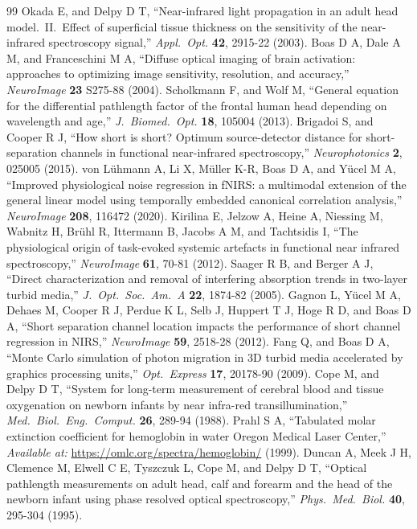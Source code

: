\documentclass[11pt]{article}
\begin{document}
\begin{thebibliography}{99}
 Okada E, and Delpy D T, ``Near-infrared light propagation in an adult head model.\ II.\ Effect of superficial tissue thickness on the sensitivity of the near-infrared spectroscopy signal,'' \textit{Appl.\ Opt.} \textbf{42}, 2915-22 (2003).
 Boas D A, Dale A M, and Franceschini M A, ``Diffuse optical imaging of brain activation: approaches to optimizing image sensitivity, resolution, and accuracy,'' \textit{NeuroImage} \textbf{23} S275-88 (2004).
 Scholkmann F, and Wolf M, ``General equation for the differential pathlength factor of the frontal human head depending on wavelength and age,'' \textit{J.\ Biomed.\ Opt.} \textbf{18}, 105004 (2013).
 Brigadoi S, and Cooper R J, ``How short is short? Optimum source-detector distance for short-separation channels in functional near-infrared spectroscopy,'' \textit{Neurophotonics} \textbf{2}, 025005 (2015).
 von L\"uhmann A, Li X, M\"uller K-R, Boas D A, and Y\"ucel M A, ``Improved physiological noise regression in fNIRS: a multimodal extension of the general linear model using temporally embedded canonical correlation analysis,'' \textit{NeuroImage} \textbf{208}, 116472 (2020).
 Kirilina E, Jelzow A, Heine A, Niessing M, Wabnitz H, Br\"uhl R, Ittermann B, Jacobs A M, and Tachtsidis I, ``The physiological origin of task-evoked systemic artefacts in functional near infrared spectroscopy,'' \textit{NeuroImage} \textbf{61}, 70-81 (2012).
 Saager R B, and Berger A J, ``Direct characterization and removal of interfering absorption trends in two-layer turbid media,'' \textit{J.\ Opt.\ Soc.\ Am.\ A} \textbf{22}, 1874-82 (2005).
 Gagnon L, Y\"ucel M A, Dehaes M, Cooper R J, Perdue K L, Selb J, Huppert T J, Hoge R D, and Boas D A, ``Short separation channel location impacts the performance of short channel regression in NIRS,'' \textit{NeuroImage} \textbf{59}, 2518-28 (2012).
 Fang Q, and Boas D A, ``Monte Carlo simulation of photon migration in 3D turbid media accelerated by graphics processing units,'' \textit{Opt.\ Express} \textbf{17}, 20178-90 (2009).
 Cope M, and Delpy D T, ``System for long-term measurement of cerebral blood and tissue oxygenation on newborn infants by near infra-red transillumination,'' \textit{Med.\ Biol.\ Eng.\ Comput.} \textbf{26}, 289-94 (1988).
 Prahl S A, ``Tabulated molar extinction coefficient for hemoglobin in water Oregon Medical Laser Center,'' \textit{Available at:} \url{https://omlc.org/spectra/hemoglobin/} (1999).
 Duncan A, Meek J H, Clemence M, Elwell C E, Tyszczuk L, Cope M, and Delpy D T, ``Optical pathlength measurements on adult head, calf and forearm and the head of the newborn infant using phase resolved optical spectroscopy,'' \textit{Phys.\ Med.\ Biol.} \textbf{40}, 295-304 (1995).

\end{thebibliography}
\end{document}
